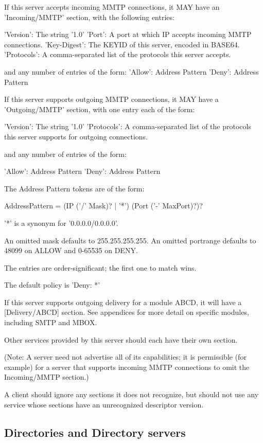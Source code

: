 If this server accepts incoming MMTP connections, it MAY have an
'Incoming/MMTP' section, with the following entries:

     'Version': The string '1.0'
     'Port': A port at which IP accepts incoming MMTP connections.
     'Key-Digest': The KEYID of this server, encoded in BASE64.
     'Protocols': A comma-separated list of the protocols this
           server accepts.

and any number of entries of the form:
     'Allow': Address Pattern
     'Deny': Address Pattern

If this server supports outgoing MMTP connections, it MAY have a
'Outgoing/MMTP' section, with one entry each of the form:

      'Version': The string '1.0'
      'Protocols': A comma-separated list of the protocols this server
           supports for outgoing connections.

and any number of entries of the form:

      'Allow': Address Pattern
      'Deny': Address Pattern

The Address Pattern tokens are of the form:

   AddressPattern = (IP ('/' Mask)? | '*') (Port ('-' MaxPort)?)?

'*' is a synonym for '0.0.0.0/0.0.0.0'.

An omitted mask defaults to 255.255.255.255.  An omitted portrange
defaults to 48099 on ALLOW and 0-65535 on DENY.

The entries are order-significant; the first one to match wins.

The default policy is 'Deny: *'

If this server supports outgoing delivery for a module ABCD, it will
have a [Delivery/ABCD] section.  See appendices for more detail on
specific modules, including SMTP and MBOX.

Other services provided by this server should each have their own section.

(Note: A server need not advertise all of its capabilities; it is
permissible (for example) for a server that supports incoming MMTP
connections to omit the Incoming/MMTP section.)

A client should ignore any sections it does not recognize, but should
not use any service whose sections have an unrecognized descriptor
version.

\subsection{Directories and Directory servers}

